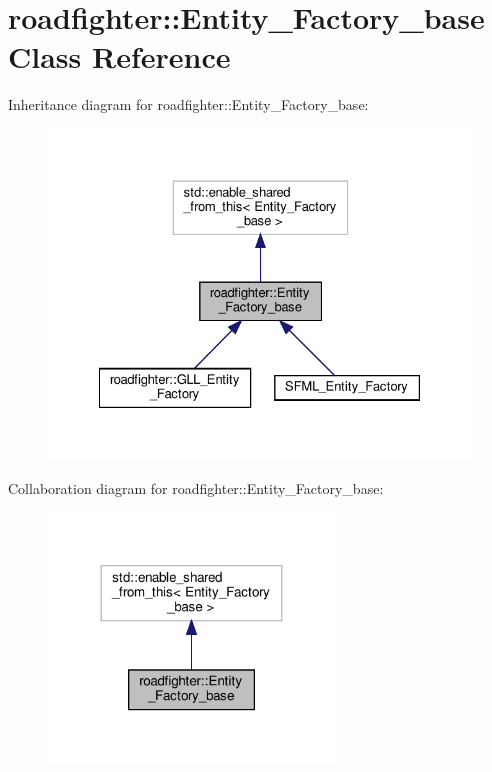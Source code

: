 \hypertarget{classroadfighter_1_1Entity__Factory__base}{}\section{roadfighter\+:\+:Entity\+\_\+\+Factory\+\_\+base Class Reference}
\label{classroadfighter_1_1Entity__Factory__base}


Inheritance diagram for roadfighter\+:\+:Entity\+\_\+\+Factory\+\_\+base\+:\nopagebreak
\begin{figure}[H]
\begin{center}
\leavevmode
\includegraphics[width=328pt]{classroadfighter_1_1Entity__Factory__base__inherit__graph}
\end{center}
\end{figure}


Collaboration diagram for roadfighter\+:\+:Entity\+\_\+\+Factory\+\_\+base\+:\nopagebreak
\begin{figure}[H]
\begin{center}
\leavevmode
\includegraphics[width=215pt]{classroadfighter_1_1Entity__Factory__base__coll__graph}
\end{center}
\end{figure}
